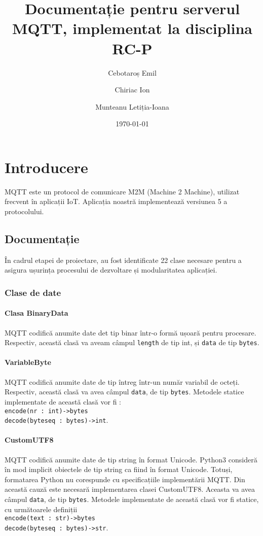 \documentclass{report}
\title{Documentație pentru serverul MQTT, implementat la disciplina RC-P}
\author{Cebotaroș Emil\and Chiriac Ion\and Munteanu Letiția-Ioana}
\affil{grupa 1307A, Facultatea de Automatică și Calculatoare\\Universitatea Tehnică "Gheorghe Asachi", Iași, România}
\date{\today}
\begin{document}
\maketitle
\tableofcontents
\newpage
\chapter{Introducere}
MQTT este un protocol de comunicare M2M (Machine 2 Machine), utilizat frecvent în aplicații IoT. Aplicația noastră implementează versiunea 5 a protocolului. 
\section{Documentație}
În cadrul etapei de proiectare, au fost identificate 22 clase necesare pentru a asigura ușurința procesului de dezvoltare și modularitatea aplicației. 
\subsection{Clase de date}
\subsubsection{Clasa BinaryData}
MQTT codifică anumite date det tip binar într-o formă ușoară pentru procesare. Respectiv, această clasă va aveam câmpul \verb|length| de tip int, și \verb|data| de tip \verb|bytes|.
\subsubsection{VariableByte}
MQTT codifică anumite date de tip întreg într-un număr variabil de octeți. Respectiv, această clasă va avea câmpul \verb|data|, de tip \verb|bytes|. Metodele statice implementate de această clasă vor fi :
\\
\verb|encode(nr : int)->bytes|
\\
\verb|decode(byteseq : bytes)->int|. 
\subsubsection{CustomUTF8}
MQTT codifică anumite date de tip string în format Unicode. Python3 consideră în mod implicit obiectele de tip string ca fiind în format Unicode. Totuși, formatarea Python nu corespunde cu specificațiile implementării MQTT. Din această cauză este necesară implementarea clasei CustomUTF8.
Aceasta va avea câmpul \verb|data|, de tip \verb|bytes|. Metodele implementate de această clasă vor fi statice, cu următoarele definiții\\\verb|encode(text : str)->bytes|\\\verb|decode(byteseq : bytes)->str|. 
\end{document}

